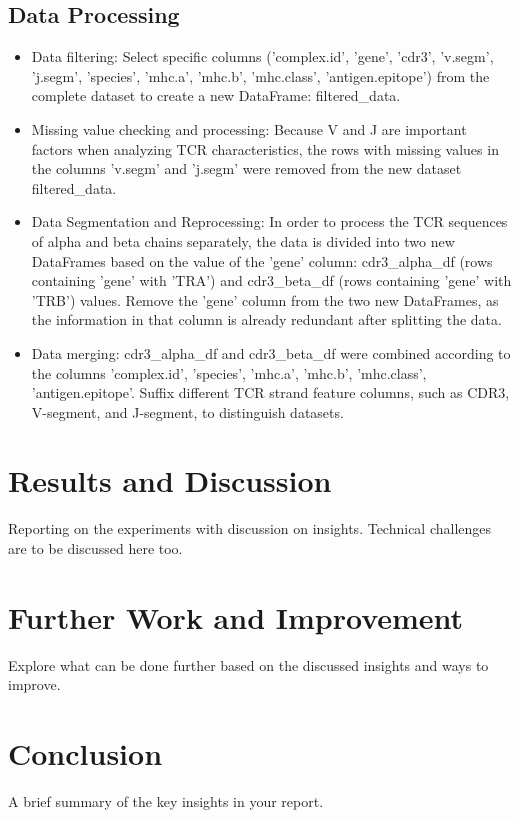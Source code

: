 \documentclass[conference]{IEEEtran}
\begin{document}
	\subsection{Data Processing}
	\begin{itemize}
		\item Data filtering: Select specific columns ('complex.id', 'gene', 'cdr3', 'v.segm', 'j.segm', 'species', 'mhc.a', 'mhc.b', 'mhc.class', 'antigen.epitope') from the complete dataset to create a new DataFrame: filtered\_data.
		\item Missing value checking and processing: Because V and J are important factors when analyzing TCR characteristics, the rows with missing values in the columns 'v.segm' and 'j.segm' were removed from the new dataset filtered\_data.
		\item Data Segmentation and Reprocessing: In order to process the TCR sequences of alpha and beta chains separately, the data is divided into two new DataFrames based on the value of the 'gene' column: cdr3\_alpha\_df (rows containing 'gene' with 'TRA') and cdr3\_beta\_df (rows containing 'gene' with 'TRB') values. Remove the 'gene' column from the two new DataFrames, as the information in that column is already redundant after splitting the data.
		\item Data merging: cdr3\_alpha\_df and cdr3\_beta\_df were combined according to the columns 'complex.id', 'species', 'mhc.a', 'mhc.b', 'mhc.class', 'antigen.epitope'. Suffix different TCR strand feature columns, such as CDR3, V-segment, and J-segment, to distinguish datasets.
		
	\end{itemize}
	
	
	\section{Results and Discussion}
	{\color{blue}Reporting on the experiments with discussion on insights. Technical challenges are to be discussed here too.}
	
	\section{Further Work and Improvement}
	{\color{blue}Explore what can be done further based on the discussed insights and ways to improve.}
	
	\section{Conclusion}
	{\color{blue}A brief summary of the key insights in your report.}
	
\end{document}
